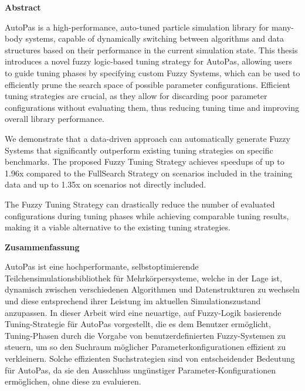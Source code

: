 {}
\vspace*{2cm}
\begin{center}
    {\Large \textbf{Abstract}}
\end{center}
\vspace{1cm}

AutoPas is a high-performance, auto-tuned particle simulation library for many-body systems, capable of dynamically switching between algorithms and data structures based on their performance in the current simulation state.
This thesis introduces a novel fuzzy logic-based tuning strategy for AutoPas, allowing users to guide tuning phases by specifying custom Fuzzy Systems, which can be used to efficiently prune the search space of possible parameter configurations. Efficient tuning strategies are crucial, as they allow for discarding poor parameter configurations without evaluating them, thus reducing tuning time and improving overall library performance.

We demonstrate that a data-driven approach can automatically generate Fuzzy Systems that significantly outperform existing tuning strategies on specific benchmarks. The proposed Fuzzy Tuning Strategy achieves speedups of up to 1.96x compared to the FullSearch Strategy on scenarios included in the training data and up to 1.35x on scenarios not directly included.

The Fuzzy Tuning Strategy can drastically reduce the number of evaluated configurations during tuning phases while achieving comparable tuning results, making it a viable alternative to the existing tuning strategies.

\cleardoublepage

{}
\vspace*{2cm}
\begin{center}
    {\Large \textbf{Zusammenfassung}}
\end{center}
\vspace{1cm}

AutoPas ist eine hochperformante, selbstoptimierende Teilchensimulationsbibliothek für Mehrkörpersysteme, welche in der Lage ist, dynamisch zwischen verschiedenen Algorithmen und Datenstrukturen zu wechseln und diese entsprechend ihrer Leistung im aktuellen Simulationszustand anzupassen.
In dieser Arbeit wird eine neuartige, auf Fuzzy-Logik basierende Tuning-Strategie für AutoPas vorgestellt, die es dem Benutzer ermöglicht, Tuning-Phasen durch die Vorgabe von benutzerdefinierten Fuzzy-Systemen zu steuern, um so den Suchraum möglicher Parameterkonfigurationen effizient zu verkleinern. Solche effizienten Suchstrategien sind von entscheidender Bedeutung für AutoPas, da sie den Ausschluss ungünstiger Parameter-Konfigurationen ermöglichen, ohne diese zu evaluieren.

